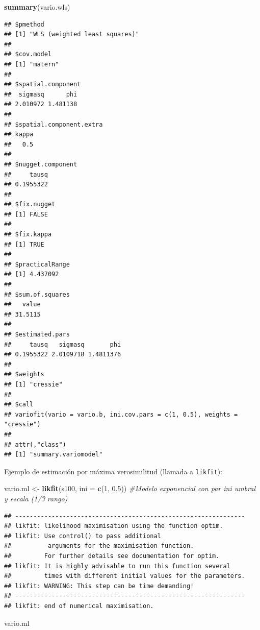 \documentclass[
]{book}
\newenvironment{Shaded}{\begin{snugshade}}{\end{snugshade}}
\newcommand{\AttributeTok}[1]{\textcolor[rgb]{0.13,0.29,0.53}{#1}}
\newcommand{\CommentTok}[1]{\textcolor[rgb]{0.56,0.35,0.01}{\textit{#1}}}
\newcommand{\DecValTok}[1]{\textcolor[rgb]{0.00,0.00,0.81}{#1}}
\newcommand{\FloatTok}[1]{\textcolor[rgb]{0.00,0.00,0.81}{#1}}
\newcommand{\FunctionTok}[1]{\textcolor[rgb]{0.13,0.29,0.53}{\textbf{#1}}}
\newcommand{\NormalTok}[1]{#1}
\newcommand{\OtherTok}[1]{\textcolor[rgb]{0.56,0.35,0.01}{#1}}
\theoremstyle{break}
\theoremstyle{definition}
\theoremstyle{definition}
\theoremstyle{definition}
\theoremstyle{definition}
\theoremstyle{remark}
\begin{document}
\begin{Shaded}
\begin{Highlighting}[]
\FunctionTok{summary}\NormalTok{(vario.wls)}
\end{Highlighting}
\end{Shaded}

\begin{verbatim}
## $pmethod
## [1] "WLS (weighted least squares)"
## 
## $cov.model
## [1] "matern"
## 
## $spatial.component
##  sigmasq      phi 
## 2.010972 1.481138 
## 
## $spatial.component.extra
## kappa 
##   0.5 
## 
## $nugget.component
##     tausq 
## 0.1955322 
## 
## $fix.nugget
## [1] FALSE
## 
## $fix.kappa
## [1] TRUE
## 
## $practicalRange
## [1] 4.437092
## 
## $sum.of.squares
##   value 
## 31.5115 
## 
## $estimated.pars
##     tausq   sigmasq       phi 
## 0.1955322 2.0109718 1.4811376 
## 
## $weights
## [1] "cressie"
## 
## $call
## variofit(vario = vario.b, ini.cov.pars = c(1, 0.5), weights = "cressie")
## 
## attr(,"class")
## [1] "summary.variomodel"
\end{verbatim}

Ejemplo de estimación por máxima verosimilitud (llamada a \texttt{likfit}):

\begin{Shaded}
\begin{Highlighting}[]
\NormalTok{vario.ml }\OtherTok{\textless{}{-}} \FunctionTok{likfit}\NormalTok{(s100, }\AttributeTok{ini =} \FunctionTok{c}\NormalTok{(}\DecValTok{1}\NormalTok{, }\FloatTok{0.5}\NormalTok{)) }\CommentTok{\#Modelo exponencial con par ini umbral y escala (1/3 rango)}
\end{Highlighting}
\end{Shaded}

\begin{verbatim}
## ---------------------------------------------------------------
## likfit: likelihood maximisation using the function optim.
## likfit: Use control() to pass additional
##          arguments for the maximisation function.
##         For further details see documentation for optim.
## likfit: It is highly advisable to run this function several
##         times with different initial values for the parameters.
## likfit: WARNING: This step can be time demanding!
## ---------------------------------------------------------------
## likfit: end of numerical maximisation.
\end{verbatim}

\begin{Shaded}
\begin{Highlighting}[]
\NormalTok{vario.ml}
\end{Highlighting}
\end{Shaded}
\end{document}
